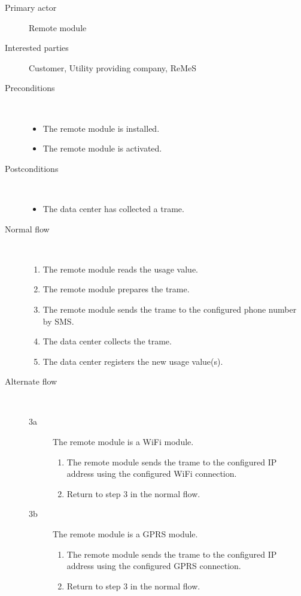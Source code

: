 \begin{description}
	\item[Primary actor] Remote module
	\item[Interested parties] Customer, Utility providing company, ReMeS
	\item[Preconditions] \ 
	\begin{itemize}
		\item The remote module is installed.
		\item The remote module is activated.
	\end{itemize}
	\item[Postconditions] \ 
	\begin{itemize}
		\item The data center has collected a trame.
	\end{itemize}
	\item[Normal flow] \ 
	\begin{enumerate}
	  	\item The remote module reads the usage value.
		\item The remote module prepares the trame.
		\item The remote module sends the trame to the configured phone number by SMS.
		\item The data center collects the trame.
		\item The data center registers the new usage value(s).
	\end{enumerate}
	\item[Alternate flow] \ 
	\begin{description}
		\item[3a] The remote module is a WiFi module.
		\begin{enumerate}
			\item The remote module sends the trame to the configured IP address using
			the configured WiFi connection.
			\item Return to step 3 in the normal flow.
		\end{enumerate}
		\item[3b] The remote module is a GPRS module.
		\begin{enumerate}
			\item The remote module sends the trame to the configured IP address using
			the configured GPRS connection.
			\item Return to step 3 in the normal flow.
		\end{enumerate}
	\end{description}

\end{description}
